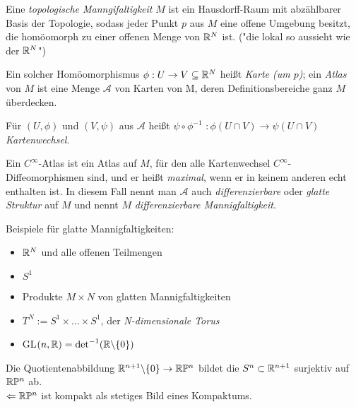 \begin{defi}
	Eine \emph{topologische Manngifaltigkeit} $M$ ist ein Hausdorff-Raum mit abzählbarer Basis der Topologie, 
	sodass jeder Punkt $p$ aus $M$ eine offene Umgebung besitzt,
	die homöomorph zu einer offenen Menge von $\mathbb R^N$ ist. ("die lokal so aussieht wie der $\mathbb R^N$")
\end{defi}

\begin{defi}
	Ein solcher Homöomorphismus $\phi: U \to V \subseteq \mathbb R^N$ heißt \emph{Karte (um $p$)}; 
	ein \emph{Atlas} von $M$ ist eine Menge $\mathcal{A}$ von Karten von M, 
	deren Definitionsbereiche ganz $M$ überdecken.
\end{defi}

\begin{defi}[Kartenwechsel]
	Für $(U, \phi)$ und $(V, \psi)$ aus $\mathcal{A}$ heißt 
	\underline{$\psi \circ \phi^{-1}$} $: \phi(U \cap V) \to \psi(U \cap V)$ \emph{Kartenwechsel}.
\end{defi}

\begin{defi}
	Ein $C^{\infty}$-Atlas ist ein Atlas auf $M$, für den alle Kartenwechsel $C^{\infty}$-Diffeo\-morphismen sind, und er heißt \emph{maximal}, wenn er in keinem anderen echt enthalten ist.
	In diesem Fall nennt man $\mathcal{A}$ auch \emph{differenzierbare} oder \emph{glatte Struktur} auf $M$ und nennt $M$ \emph{differenzierbare Mannigfaltigkeit}.
\end{defi}

\begin{bsp} Beispiele für glatte Mannigfaltigkeiten:
\begin{itemize}
	\item $\mathbb R^N$ und alle offenen Teilmengen
	\item $S^1$
	\item Produkte $M \times N$ von glatten Mannigfaltigkeiten
	\item $T^N := S^1 \times \dots \times S^1$, der \emph{N-dimensionale Torus}
	\item GL$(n, \mathbb R) = \det^{-1}(\mathbb R \backslash \{0\})$
\end{itemize}	
\end{bsp}

\begin{bsp}
	Die Quotientenabbildung $\mathbb R^{n+1}\backslash\{0\} \to \mathbb R \mathbb{P}^n$
	bildet die $S^n\subset \mathbb R^{n+1}$ surjektiv auf $\mathbb R \mathbb{P}^n$ ab.\\
	$\Leftarrow\mathbb R \mathbb{P}^n$ ist kompakt als stetiges Bild eines Kompaktums.
\end{bsp}

